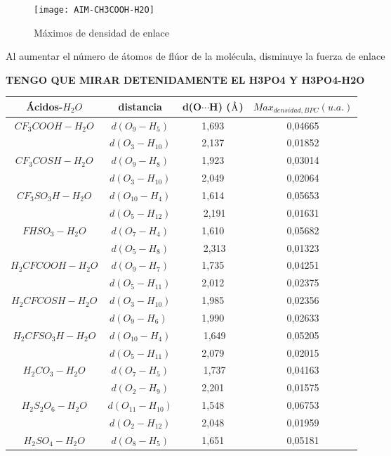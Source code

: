 \begin{figure} [H]
	\centering
	\texttt{[image: AIM-CH3COOH-H2O]}\cite{AIM}
	\caption{Máximos de densidad de enlace}
\end{figure}

Al aumentar el número de átomos de flúor de la molécula, disminuye la fuerza de enlace 

{\bfseries TENGO QUE MIRAR DETENIDAMENTE EL H3PO4 Y H3PO4-H2O}

\begin{table}[H]
	\centering
	\begin{tabular}{|c|c|c|c|}
		\hline
		Ácidos-$H_2O$ & distancia	& d(O$\cdots$H) ($\mbox{\normalfont\AA}$) & $Max_{densidad, BPC} (u. a.)$ \\ \hline
		$CF_3COOH-H_2O$ & $d(O_9-H_5)$ &1,693&0,04665\\ \cline{2-4}
& $d(O_3-H_{10})$ & 2,137 & 0,01852 \\ \hline
 $CF_3COSH-H_2O$ & $d(O_9-H_8)$	 & 1,923 & 0,03014 \\ \cline{2-4}
	& $d(O_3-H_{10})$ & 2,049 & 0,02064 \\ \hline
	$CF_3SO_3H-H_2O$ & $d(O_{10}-H_4)$ & ﻿1,614 & 0,05653 \\ \cline{2-4}
	& $d(O_5-H_{12})$	&﻿ 2,191 &	0,01631 \\ \hline
 $FHSO_3-H_2O$	& $d(O_7-H_4)$ & 1,610 &	0,05682 \\ \cline{2-4}
	& $d(O_5-H_8)$	&﻿ 2,313	& 0,01323 \\ \hline
 $H_2CFCOOH-H_2O$	&$d(O_9-H_7)$ & 1,735	& 0,04251 \\ \cline{2-4}
	& $d(O_5-H_{11})$ & 2,012	& 0,02375 \\ \hline
 $H_2CFCOSH-H_2O$ &	$d(O_3-H_{10})$ & 1,985 &	0,02356 \\ \cline{2-4}
	& $d(O_9-H_6)$ ﻿& 1,990	& 0,02633 \\ \hline
 $H_2CFSO_3H-H_2O$ &	$d(O_{10}-H_4)$	&﻿ 1,649	& 0,05205 \\ \cline{2-4}
	& $d(O_5-H_{11})$ & 2,079	& 0,02015 \\ \hline
 $H_2CO_3-H_2O$	& $d(O_7-H_5)$	&﻿ 1,737	& 0,04163 \\ \cline{2-4}
	& $d(O_2-H_9)$ & 2,201	& 0,01575 \\ \hline
 $H_2S_2O_6-H_2O$ &	$d(O_{11}-H_{10})$	& ﻿1,548 &	0,06753 \\ \cline{2-4}
	& $d(O_2-H_{12})$ & 2,048 &	0,01959 \\ \hline
 $H_2SO_4-H_2O$	& $d(O_8-H_5)$ & 1,651	& 0,05181 \\ \cline{2-4}

\end{tabular}
\end{table}
